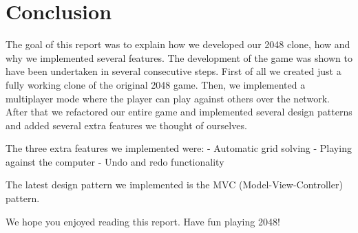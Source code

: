 \documentclass[a4paper,11pt,report]{scrartcl}
\begin{document}
\newpage\section{Conclusion}

The goal of this report was to explain how we developed our 2048 clone, how and why we implemented several features. 
The development of the game was shown to have been undertaken in several consecutive steps. First of all we created just a fully working clone of the original 2048 game. Then, we implemented a multiplayer mode where the player can play against others over the network. After that we refactored our entire game and implemented several design patterns and added several extra features we thought of ourselves.

The three extra features we implemented were:
- Automatic grid solving 
- Playing against the computer 
- Undo and redo functionality

The latest design pattern we implemented is the MVC (Model-View-Controller) pattern.

We hope you enjoyed reading this report. Have fun playing 2048!
\end{document}
